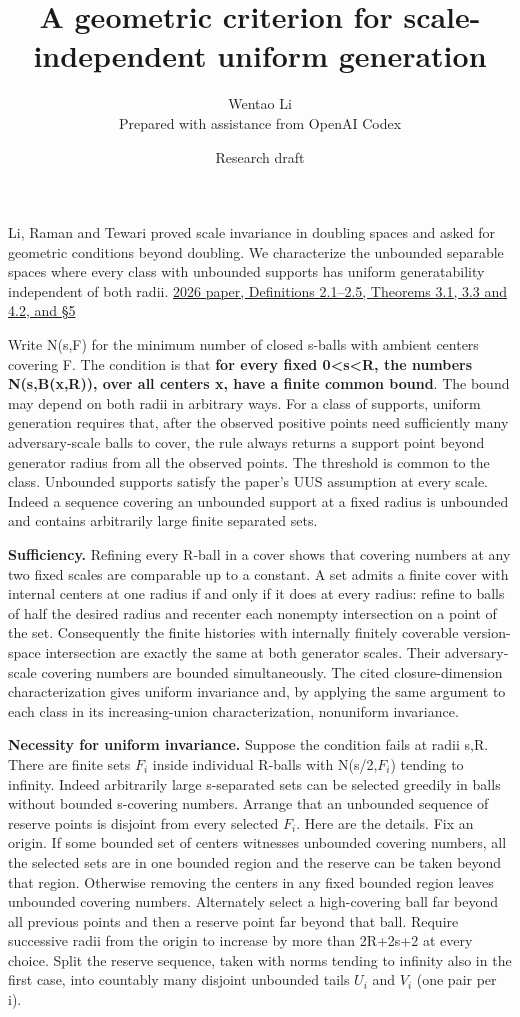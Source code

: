 \documentclass[11pt]{article}
\title{A geometric criterion for scale-independent uniform generation}
\author{Wentao Li\\{\small Prepared with assistance from OpenAI Codex}}
\date{Research draft}
\begin{document}
\maketitle
Li, Raman and Tewari proved scale invariance in doubling spaces and asked for geometric conditions beyond doubling. We characterize the unbounded separable spaces where every class with unbounded supports has uniform generatability independent of both radii. \href{https://arxiv.org/abs/2602.07710v2}{2026 paper, Definitions 2.1--2.5, Theorems 3.1, 3.3 and 4.2, and §5}

Write N(s,F) for the minimum number of closed s-balls with ambient centers covering F. The condition is that \textbf{for every fixed 0\textless s\textless R, the numbers N(s,B(x,R)), over all centers x, have a finite common bound}. The bound may depend on both radii in arbitrary ways. For a class of supports, uniform generation requires that, after the observed positive points need sufficiently many adversary-scale balls to cover, the rule always returns a support point beyond generator radius from all the observed points. The threshold is common to the class. Unbounded supports satisfy the paper's UUS assumption at every scale. Indeed a sequence covering an unbounded support at a fixed radius is unbounded and contains arbitrarily large finite separated sets.

\textbf{Sufficiency.} Refining every R-ball in a cover shows that covering numbers at any two fixed scales are comparable up to a constant. A set admits a finite cover with internal centers at one radius if and only if it does at every radius: refine to balls of half the desired radius and recenter each nonempty intersection on a point of the set. Consequently the finite histories with internally finitely coverable version-space intersection are exactly the same at both generator scales. Their adversary-scale covering numbers are bounded simultaneously. The cited closure-dimension characterization gives uniform invariance and, by applying the same argument to each class in its increasing-union characterization, nonuniform invariance.

\textbf{Necessity for uniform invariance.} Suppose the condition fails at radii s,R. There are finite sets \(F_{i}\) inside individual R-balls with N(s/2,\(F_{i}\)) tending to infinity. Indeed arbitrarily large s-separated sets can be selected greedily in balls without bounded s-covering numbers. Arrange that an unbounded sequence of reserve points is disjoint from every selected \(F_{i}\). Here are the details. Fix an origin. If some bounded set of centers witnesses unbounded covering numbers, all the selected sets are in one bounded region and the reserve can be taken beyond that region. Otherwise removing the centers in any fixed bounded region leaves unbounded covering numbers. Alternately select a high-covering ball far beyond all previous points and then a reserve point far beyond that ball. Require successive radii from the origin to increase by more than 2R+2s+2 at every choice. Split the reserve sequence, taken with norms tending to infinity also in the first case, into countably many disjoint unbounded tails \(U_{i}\) and \(V_{i}\) (one pair per i).
\end{document}

